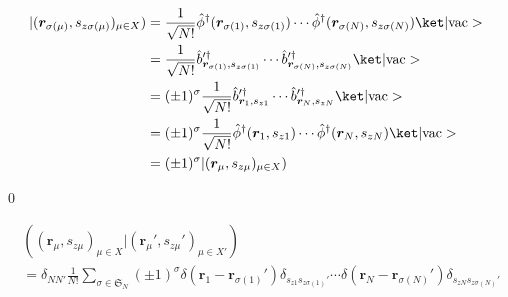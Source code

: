 \documentclass[uplatex,dvipdfmx,a4paper,11pt]{jlreq}
\makeatletter
\renewcommand{\SS}{\mathfrak{S}}
\newcommand{\rr}{\bm{r}}
\numberwithin{equation}{section}
\theoremstyle{definition}
\renewenvironment{proof}[1][\proofname]{\par
  \normalfont
  \topsep6\p@\@plus6\p@ \trivlist
  \item[\hskip\labelsep{\bfseries #1}\@addpunct{\bfseries}]\ignorespaces\quad\par
}{
  \qed\endtrivlist\@endpefalse
}
\renewcommand\proofname{証明}
\makeatother
\begin{document}
\begin{proof}
  \begin{align}
    |(\rr_{\sigma(\mu)}, s_{z\sigma(\mu)})_{\mu\in X}) & = \frac{1}{\sqrt{N!}}\hat{\phi}^\dagger(\rr_{\sigma(1)}, s_{z\sigma(1)})\cdots\hat{\phi}^\dagger(\rr_{\sigma(N)}, s_{z\sigma(N)})\ket|\mathrm{vac}>             \\
                                                       & = \frac{1}{\sqrt{N!}}\hat{b}^{\prime\dagger}_{\rr_{\sigma(1)}, s_{z\sigma(1)}}\cdots\hat{b}^{\prime\dagger}_{\rr_{\sigma(N)}, s_{z\sigma(N)}}\ket|\mathrm{vac}> \\
                                                       & = (\pm 1)^\sigma\frac{1}{\sqrt{N!}}\hat{b}^{\prime\dagger}_{\rr_1, s_{z1}}\cdots\hat{b}^{\prime\dagger}_{\rr_{N}, s_{zN}}\ket|\mathrm{vac}>                     \\
                                                       & = (\pm 1)^\sigma\frac{1}{\sqrt{N!}}\hat{\phi}^\dagger(\rr_1, s_{z1})\cdots\hat{\phi}^\dagger(\rr_N, s_{zN})\ket|\mathrm{vac}>                                   \\
                                                       & = (\pm 1)^\sigma|(\rr_{\mu}, s_{z\mu})_{\mu\in X})
  \end{align}
\end{proof}
\begin{theorem}
  \begin{align}
     & ((\rr_{\mu}, s_{z\mu})_{\mu\in X}|(\rr_{\mu}', s_{z\mu}')_{\mu\in X'})                                                                                                                          \\
     & = \delta_{NN'}\frac{1}{N!}\sum_{\sigma\in\SS_N}(\pm 1)^\sigma\delta(\rr_1 - \rr_{\sigma(1)}')\delta_{s_{z1}s_{z\sigma(1)}'}\cdots\delta(\rr_N - \rr_{\sigma(N)}')\delta_{s_{zN}s_{z\sigma(N)}'}
  \end{align}
\end{theorem}
\end{document}
